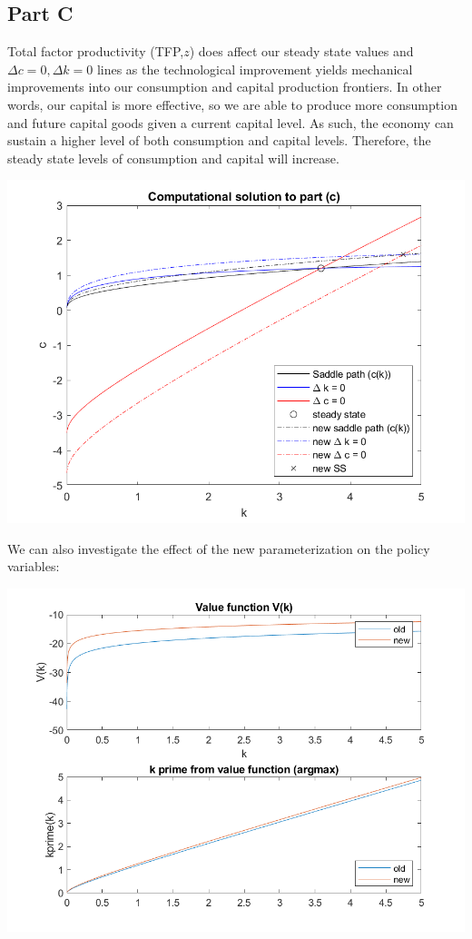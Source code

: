 \documentclass[11pt]{article} %
\begin{document}
\subsection{Part C}

Total factor productivity (TFP,$z$) does affect our steady state values and $\Delta c = 0,\Delta k = 0$ lines as the technological improvement yields mechanical improvements into our consumption and capital production frontiers. In other words, our capital is more effective, so we are able to produce more consumption and future capital goods given a current capital level. As such, the economy can sustain a higher level of both consumption and capital levels. Therefore, the steady state levels of consumption and capital will increase.

\includegraphics{partC}

We can also investigate the effect of the new parameterization on the policy variables:

\includegraphics{partC2}
\end{document}
